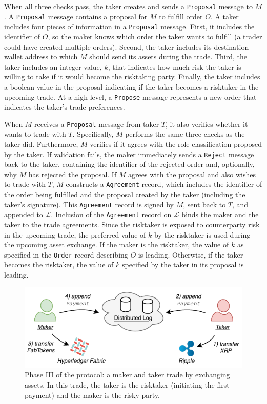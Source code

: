 When all three checks pass, the taker creates and sends a \texttt{Proposal} message to $ M $.
A \texttt{Proposal} message contains a proposal for $ M $ to fulfill order $ O $.
A taker includes four pieces of information in a \texttt{Proposal} message.
First, it includes the identifier of $ O $, so the maker knows which order the taker wants to fulfill (a trader could have created multiple orders).
Second, the taker includes its destination wallet address to which $ M $ should send its assets during the trade.
Third, the taker includes an integer value, $ k $, that indicates how much risk the taker is willing to take if it would become the risktaking party.
Finally, the taker includes a boolean value in the proposal indicating if the taker becomes a risktaker in the upcoming trade.
At a high level, a \texttt{Propose} message represents a new order that indicates the taker's trade preferences.

When $ M $ receives a \texttt{Proposal} message from taker $ T $, it also verifies whether it wants to trade with $ T $.
Specifically, $ M $ performs the same three checks as the taker did.
Furthermore, $ M $ verifies if it agrees with the role classification proposed by the taker.
If validation fails, the maker immediately sends a \texttt{Reject} message back to the taker, containing the identifier of the rejected order and, optionally, why $ M $ has rejected the proposal.
If $ M $ agrees with the proposal and also wishes to trade with $ T $, $ M $ constructs a \texttt{Agreement} record, which includes the identifier of the order being fulfilled and the proposal created by the taker (including the taker's signature).
This \texttt{Agreement} record is signed by $ M $, sent back to $ T $, and appended to $ \mathcal{L} $.
Inclusion of the \texttt{Agreement} record on $ \mathcal{L} $ binds the maker and the taker to the trade agreements.
Since the risktaker is exposed to counterparty risk in the upcoming trade, the preferred value of $ k $ by the risktaker is used during the upcoming asset exchange.
If the maker is the risktaker, the value of $ k $ as specified in the \texttt{Order} record describing $ O $ is leading.
Otherwise, if the taker becomes the risktaker, the value of $ k $ specified by the taker in its proposal is leading.

\begin{figure}[h]
	\centering
	\includegraphics[width=0.8\linewidth]{xchange/assets/xchange_protocol_3}
	\caption{Phase III of the \ModelName{} protocol: a maker and taker trade by exchanging assets. In this trade, the taker is the risktaker (initiating the first payment) and the maker is the risky party.}
	\label{fig:matching_protocol_3}
\end{figure}

